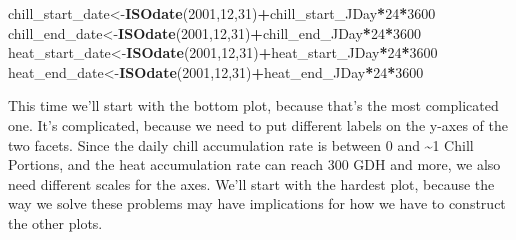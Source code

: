 \documentclass[
]{book}
\newenvironment{Shaded}{\begin{snugshade}}{\end{snugshade}}
\newcommand{\DecValTok}[1]{\textcolor[rgb]{0.00,0.00,0.81}{#1}}
\newcommand{\KeywordTok}[1]{\textcolor[rgb]{0.13,0.29,0.53}{\textbf{#1}}}
\newcommand{\NormalTok}[1]{#1}
\newcommand{\OperatorTok}[1]{\textcolor[rgb]{0.81,0.36,0.00}{\textbf{#1}}}
\begin{document}
\begin{Shaded}
\begin{Highlighting}[]
\NormalTok{chill_start_date<-}\KeywordTok{ISOdate}\NormalTok{(}\DecValTok{2001}\NormalTok{,}\DecValTok{12}\NormalTok{,}\DecValTok{31}\NormalTok{)}\OperatorTok{+}\NormalTok{chill_start_JDay}\OperatorTok{*}\DecValTok{24}\OperatorTok{*}\DecValTok{3600}
\NormalTok{chill_end_date<-}\KeywordTok{ISOdate}\NormalTok{(}\DecValTok{2001}\NormalTok{,}\DecValTok{12}\NormalTok{,}\DecValTok{31}\NormalTok{)}\OperatorTok{+}\NormalTok{chill_end_JDay}\OperatorTok{*}\DecValTok{24}\OperatorTok{*}\DecValTok{3600}
\NormalTok{heat_start_date<-}\KeywordTok{ISOdate}\NormalTok{(}\DecValTok{2001}\NormalTok{,}\DecValTok{12}\NormalTok{,}\DecValTok{31}\NormalTok{)}\OperatorTok{+}\NormalTok{heat_start_JDay}\OperatorTok{*}\DecValTok{24}\OperatorTok{*}\DecValTok{3600}
\NormalTok{heat_end_date<-}\KeywordTok{ISOdate}\NormalTok{(}\DecValTok{2001}\NormalTok{,}\DecValTok{12}\NormalTok{,}\DecValTok{31}\NormalTok{)}\OperatorTok{+}\NormalTok{heat_end_JDay}\OperatorTok{*}\DecValTok{24}\OperatorTok{*}\DecValTok{3600}
\end{Highlighting}
\end{Shaded}

This time we'll start with the bottom plot, because that's the most complicated one. It's complicated, because we need to put different labels on the y-axes of the two facets. Since the daily chill accumulation rate is between 0 and \textasciitilde1 Chill Portions, and the heat accumulation rate can reach 300 GDH and more, we also need different scales for the axes. We'll start with the hardest plot, because the way we solve these problems may have implications for how we have to construct the other plots.
\end{document}
